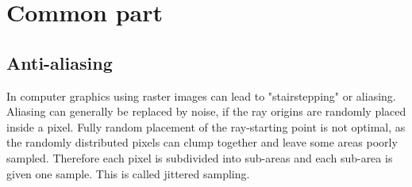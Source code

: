 \section{Common part}
\subsection{Anti-aliasing}
In computer graphics using raster images can lead to "stairstepping" or aliasing. Aliasing can generally be replaced by noise, if the ray origins are randomly placed inside a pixel. Fully random placement of the ray-starting point is not optimal, as the randomly distributed pixels can clump together and leave some areas poorly sampled. Therefore each pixel is subdivided into sub-areas and each sub-area is given one sample. This is called jittered sampling. 


